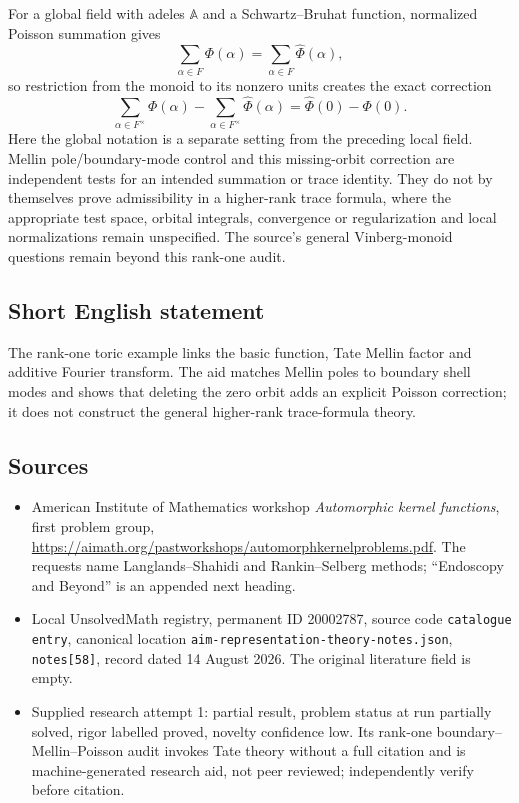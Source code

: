 \documentclass[11pt]{article}
\begin{document}
For a global field with adeles $\mathbb A$ and a Schwartz--Bruhat function, normalized Poisson summation gives
\[
 \sum_{\alpha\in F}\Phi(\alpha)=\sum_{\alpha\in F}\widehat\Phi(\alpha),
\]
so restriction from the monoid to its nonzero units creates the exact correction
\[
 \sum_{\alpha\in F^\times}\Phi(\alpha)
  -\sum_{\alpha\in F^\times}\widehat\Phi(\alpha)
       =\widehat\Phi(0)-\Phi(0).
\]
Here the global notation is a separate setting from the preceding local field. Mellin pole/boundary-mode control and this missing-orbit correction are independent tests for an intended summation or trace identity. They do not by themselves prove admissibility in a higher-rank trace formula, where the appropriate test space, orbital integrals, convergence or regularization and local normalizations remain unspecified. The source's general Vinberg-monoid questions remain beyond this rank-one audit.
\subsection{Short English statement}
The rank-one toric example links the basic function, Tate Mellin factor and additive Fourier transform. The aid matches Mellin poles to boundary shell modes and shows that deleting the zero orbit adds an explicit Poisson correction; it does not construct the general higher-rank trace-formula theory.
\subsection{Sources}
\begin{itemize}
\item American Institute of Mathematics workshop \emph{Automorphic kernel functions}, first problem group, \url{https://aimath.org/pastworkshops/automorphkernelproblems.pdf}. The requests name Langlands--Shahidi and Rankin--Selberg methods; ``Endoscopy and Beyond'' is an appended next heading.
\item Local UnsolvedMath registry, permanent ID 20002787, source code \texttt{catalogue entry}, canonical location \texttt{aim-representation-theory-notes.json}, \texttt{notes[58]}, record dated 14 August 2026. The original literature field is empty.
\item Supplied research attempt 1: partial result, problem status at run partially solved, rigor labelled proved, novelty confidence low. Its rank-one boundary--Mellin--Poisson audit invokes Tate theory without a full citation and is machine-generated research aid, not peer reviewed; independently verify before citation.
\end{itemize}
\end{document}
